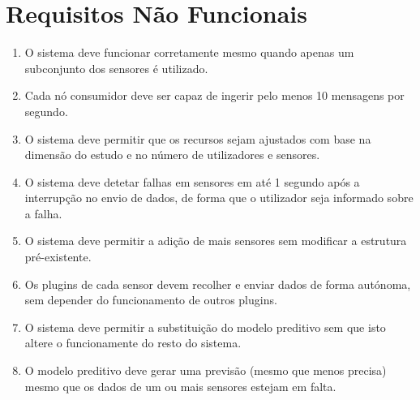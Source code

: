 \section{Requisitos Não Funcionais}

\begin{enumerate}
    \item[NFR1] O sistema deve funcionar corretamente mesmo quando apenas um subconjunto dos sensores é utilizado.
    \item[NFR2] Cada nó consumidor deve ser capaz de ingerir pelo menos 10 mensagens por segundo.
    \item[NFR3] O sistema deve permitir que os recursos sejam ajustados com base na dimensão do estudo e no número de utilizadores e sensores.
    \item[NFR4] O sistema deve detetar falhas em sensores em até 1 segundo após a interrupção no envio de dados, de forma que o utilizador seja informado sobre a falha.
    \item[NFR5] O sistema deve permitir a adição de mais sensores sem modificar a estrutura pré-existente.
    \item[NFR6] Os plugins de cada sensor devem recolher e enviar dados de forma autónoma, sem depender do funcionamento de outros plugins.
    \item[NFR7] O sistema deve permitir a substituição do modelo preditivo sem que isto altere o funcionamente do resto do sistema.
    \item[NFR8] O modelo preditivo deve gerar uma previsão (mesmo que menos precisa) mesmo que os dados de um ou mais sensores estejam em falta.
\end{enumerate}



